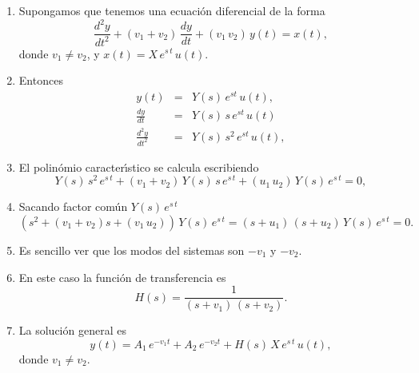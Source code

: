 \begin{enumerate}

\item Supongamos que tenemos una ecuaci\'{o}n diferencial de la forma
\begin{equation}
        \frac{d^{2}y}{dt^{2}} + (v_{1} + v_{2}) \, \frac{dy}{dt} + (v_{1} \, v_{2}) \, y(t) = x(t), 
\end{equation}
donde $v_{1} \neq v_{2}$, y $x(t) = X \, e^{s \, t} \, u(t)$.

\item Entonces 
\begin{eqnarray}
        y(t) &=& Y(s) \, e^{s t} \, u(t),               \\
        \frac{dy}{dt} &=& Y(s) \, s \, e^{s t}  \, u(t) \\  
        \frac{d^{2}y}{dt^{2}} &=& Y(s) \, s^{2} \, e^{s t} \, u(t),
\end{eqnarray}

\item El polin\'{o}mio caracter\'{\i}stico se calcula escribiendo
\begin{equation}
        Y(s) \, s^{2} \, e^{s \, t} + (v_{1} + v_{2}) \, Y(s) \, s \, e^{s \, t} + (u_{1} \, u_{2}) \, Y(s) \, e^{s \, t} = 0,
\end{equation}

\item Sacando factor com\'{u}n $Y(s) \, e^{s \, t}$
\begin{equation}
        (s^{2}  + (v_{1} + v_{2}) s + (v_{1} \, u_{2})) \, Y(s) \, e^{s \, t} = (s + u_{1})\,(s + u_{2}) \, Y(s) \, e^{s \, t} = 0.
\end{equation}

\item Es sencillo ver que los modos del sistemas son $-v_{1}$ y $-v_{2}$.

\item En este caso la funci\'{o}n de transferencia es
\begin{equation}
        H(s) = \frac{1}{(s + v_{1})\,(s + v_{2})}.
\end{equation}

\item La soluci\'{o}n general es
\begin{equation}
        y(t) = A_{1} \, e^{-v_{1} t} + A_{2} \, e^{-v_{2} t} + H(s) \, X \, e^{s \, t} \, u(t),
\end{equation}
donde $v_{1} \neq v_{2}$.


\end{enumerate}
